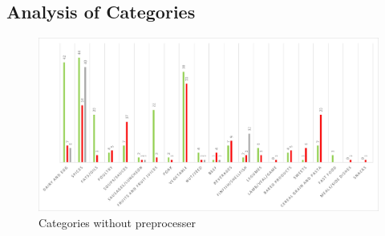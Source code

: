 \subsection{Analysis of Categories}
\begin{figure}
	\centering
	\includegraphics[scale=0.5]{Figures/categories_asela.jpg}
	\caption[Categories Analysis, initial Implementation]{Categories without preprocesser}\label{fig:cat_asela}
\end{figure}

